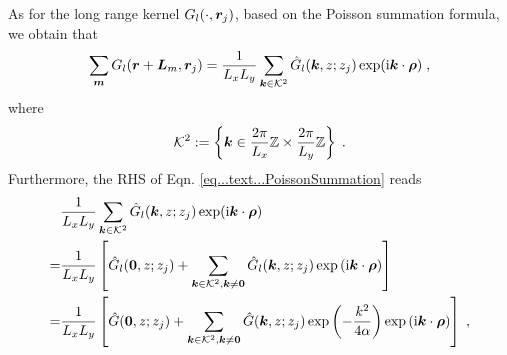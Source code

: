 As for the long  range kernel $G_l(\cdot, \boldsymbol{r}_j)$, based on the Poisson summation formula, we obtain that 
\begin{equation}\label{eq...text...PoissonSummation}
 \sum_{\bm{m}} G_l(\boldsymbol{r}+\bm{L}_m, \boldsymbol{r}_j)  =\frac{1}{ L_xL_y}   \sum_{\bm{k}\in\mathcal{K}^2} \Hat{G}_l(\bm{k},z;z_j)\exp(\textrm{i}\bm{k}\cdot \bm{\rho}) \;,
\end{equation}
where \[\mathcal{K}^2 := \left\{\bm{k} \in \frac{  2\pi}{L_x}\mathbb{Z}\times \frac{  2\pi}{L_y}\mathbb{Z} \right\}\;.\]
Furthermore, the RHS of Eqn. \eqref{eq...text...PoissonSummation} reads
\begin{align*}
&\frac{1}{ L_xL_y}   \sum_{\bm{k}\in\mathcal{K}^2} \Hat{G}_l(\bm{k},z;z_j)\exp(\textrm{i}\bm{k}\cdot \bm{\rho})\\
=& \frac{1}{ L_xL_y}   \left[\hat{G}_l(\bm{0}, z; z_j)+\sum_{\bm{k}\in\mathcal{K}^2,\bm{k}\neq\bm{0}}  \hat{G}_l(\bm{k}, z; z_j)\exp{(\mathrm{i} \boldsymbol{k} \cdot \boldsymbol{\rho})}\right]\\
=&\frac{1}{ L_xL_y}   \left[\hat{G}(\bm{0}, z; z_j)+\sum_{\bm{k}\in\mathcal{K}^2,\bm{k}\neq\bm{0}}  \hat{G}(\bm{k}, z; z_j)\exp\left(-\frac{k^2}{4\alpha}\right)\exp{(\mathrm{i} \boldsymbol{k} \cdot \boldsymbol{\rho})}\right]\;,
\end{align*}
